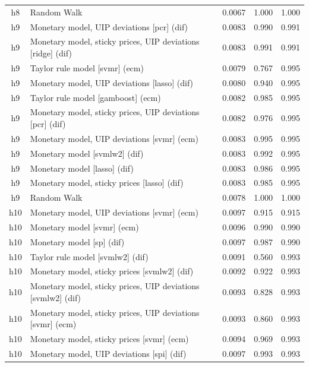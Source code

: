 \begin{ThreePartTable}
\begin{longtable}[t]{cp{5.5cm}ccc}
h8 & \raggedright Random Walk & 0.0067 & 1.000 & 1.000\\
\addlinespace
h9 & \raggedright Monetary model, UIP deviations [pcr] (dif) & 0.0083 & 0.990 & 0.991\\
h9 & \raggedright Monetary model, sticky prices, UIP deviations [ridge] (dif) & 0.0083 & 0.991 & 0.991\\
h9 & \raggedright Taylor rule model [svmr] (ecm) & 0.0079 & 0.767 & 0.995\\
h9 & \raggedright Monetary model, UIP deviations [lasso] (dif) & 0.0080 & 0.940 & 0.995\\
h9 & \raggedright Taylor rule model [gamboost] (ecm) & 0.0082 & 0.985 & 0.995\\
h9 & \raggedright Monetary model, sticky prices, UIP deviations [pcr] (dif) & 0.0082 & 0.976 & 0.995\\
h9 & \raggedright Monetary model, UIP deviations [svmr] (ecm) & 0.0083 & 0.995 & 0.995\\
h9 & \raggedright Monetary model [svmlw2] (dif) & 0.0083 & 0.992 & 0.995\\
h9 & \raggedright Monetary model [lasso] (dif) & 0.0083 & 0.986 & 0.995\\
h9 & \raggedright Monetary model, sticky prices [lasso] (dif) & 0.0083 & 0.985 & 0.995\\
h9 & \raggedright Random Walk & 0.0078 & 1.000 & 1.000\\
\addlinespace
h10 & \raggedright Monetary model, UIP deviations [svmr] (ecm) & 0.0097 & 0.915 & 0.915\\
h10 & \raggedright Monetary model [svmr] (ecm) & 0.0096 & 0.990 & 0.990\\
h10 & \raggedright Monetary model [sp] (dif) & 0.0097 & 0.987 & 0.990\\
h10 & \raggedright Taylor rule model [svmlw2] (dif) & 0.0091 & 0.560 & 0.993\\
h10 & \raggedright Monetary model, sticky prices [svmlw2] (dif) & 0.0092 & 0.922 & 0.993\\
h10 & \raggedright Monetary model, sticky prices, UIP deviations [svmlw2] (dif) & 0.0093 & 0.828 & 0.993\\
h10 & \raggedright Monetary model, sticky prices, UIP deviations [svmr] (ecm) & 0.0093 & 0.860 & 0.993\\
h10 & \raggedright Monetary model, sticky prices [svmr] (ecm) & 0.0094 & 0.969 & 0.993\\
h10 & \raggedright Monetary model, UIP deviations [spi] (dif) & 0.0097 & 0.993 & 0.993\\

\end{longtable}
\end{ThreePartTable}
